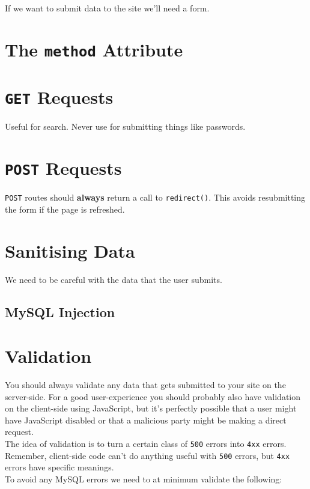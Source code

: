 If we want to submit data to the site we'll need a form.

\section{The \texttt{method} Attribute}

\section{\texttt{GET} Requests}

Useful for search. Never use for submitting things like passwords.

\section{\texttt{POST} Requests}

\texttt{POST} routes should \textbf{always} return a call to \texttt{redirect()}. This avoids resubmitting the form if the page is refreshed.



\section{Sanitising Data}

We need to be careful with the data that the user submits.

\subsection{MySQL Injection}


\section{Validation}
You should always validate any data that gets submitted to your site on the server-side. For a good user-experience you should probably also have validation on the client-side using JavaScript, but it's perfectly possible that a user might have JavaScript disabled or that a malicious party might be making a direct request.
\\

The idea of validation is to turn a certain class of \texttt{500} errors into \texttt{4xx} errors. Remember, client-side code can't do anything useful with \texttt{500} errors, but \texttt{4xx} errors have specific meanings.
\\

To avoid any MySQL errors we need to at minimum validate the following:

